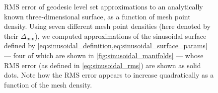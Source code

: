 \begin{figure}[htpb]
    \centering
    \caption[RMS error of geodesic level set approximations to an analytically
    known three-dimensional surface, as a function of mesh point density]
    {RMS error of geodesic level set approximations to an analytically known
    three-dimensional surface, as a function of mesh point density.
    Using seven different mesh point densities (here denoted by their
    $\Delta_{\min}$), we computed approximations of the sinusoidal surface
    defined by \cref{eq:sinusoidal_definition,eq:sinusoidal_surface_params} ---
    four of which are shown in \cref{fig:sinusoidal_manifolds} --- whose
    RMS error (as defined in \cref{eq:sinusoidal_rms}) are shown as solid
    dots. Note how the RMS error appears to increase quadratically
    as a function of the mesh density.
}
    \label{fig:sinusoidal_manifold_errors}
\end{figure}

